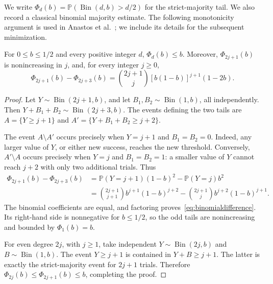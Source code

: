 \documentclass[10pt,a4paper]{article}
\DeclareMathOperator{\Bin}{Bin}
\newcommand{\Pp}{\mathbb P}
\begin{document}
We write \(\Phi_d(b)=\Pp(\Bin(d,b)>d/2)\) for the strict-majority tail. We also record a classical binomial majority estimate. The following monotonicity argument is used in Anastos et al.~\cite[Proposition~19]{ALSS}; we include its details for the subsequent minimization.
\begin{lemma}\label{lem:binomial}
For \(0\le b\le1/2\) and every positive integer \(d\),
\(\Phi_d(b)\le b\).
Moreover, \(\Phi_{2j+1}(b)\) is nonincreasing in \(j\), and, for every integer \(j\ge0\),
\begin{equation}\label{eq:binomialdifference}
\Phi_{2j+1}(b)-\Phi_{2j+3}(b)
=\binom{2j+1}{j}[b(1-b)]^{j+1}(1-2b).
\end{equation}
\end{lemma}
\begin{proof}
Let \(Y\sim\Bin(2j+1,b)\), and let \(B_1,B_2\sim\Bin(1,b)\), all independently. Then \(Y+B_1+B_2\sim\Bin(2j+3,b)\). The events defining the two tails are \(A=\{Y\ge j+1\}\) and \(A'=\{Y+B_1+B_2\ge j+2\}\).

The event \(A\setminus A'\) occurs precisely when \(Y=j+1\) and \(B_1=B_2=0\). Indeed, any larger value of \(Y\), or either new success, reaches the new threshold. Conversely, \(A'\setminus A\) occurs precisely when \(Y=j\) and \(B_1=B_2=1\): a smaller value of \(Y\) cannot reach \(j+2\) with only two additional trials. Thus
\[
\begin{aligned}
\Phi_{2j+1}(b)-\Phi_{2j+3}(b)
&=\Pp(Y=j+1)(1-b)^2-\Pp(Y=j)b^2\\
&=\binom{2j+1}{j+1}b^{j+1}(1-b)^{j+2}
-\binom{2j+1}{j}b^{j+2}(1-b)^{j+1}.
\end{aligned}
\]
The binomial coefficients are equal, and factoring proves~\eqref{eq:binomialdifference}. Its right-hand side is nonnegative for \(b\le1/2\), so the odd tails are nonincreasing and bounded by \(\Phi_1(b)=b\).

For even degree \(2j\), with \(j\ge1\), take independent \(Y\sim\Bin(2j,b)\) and \(B\sim\Bin(1,b)\). The event \(Y\ge j+1\) is contained in \(Y+B\ge j+1\). The latter is exactly the strict-majority event for \(2j+1\) trials. Therefore \(\Phi_{2j}(b)\le\Phi_{2j+1}(b)\le b\), completing the proof.
\end{proof}

\end{document}
